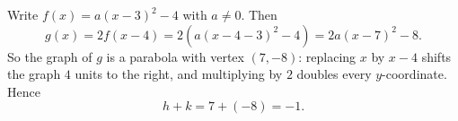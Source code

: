 Write $f(x)=a(x-3)^2-4$ with $a\ne0$. Then
\[
g(x)=2f(x-4)=2\left(a(x-4-3)^2-4\right)=2a(x-7)^2-8 .
\]
So the graph of $g$ is a parabola with vertex $(7,-8)$: replacing $x$ by $x-4$ shifts the graph $4$ units to the right, and multiplying by $2$ doubles every $y$-coordinate. Hence
\[
h+k=7+(-8)=\boxed{-1}.
\]
